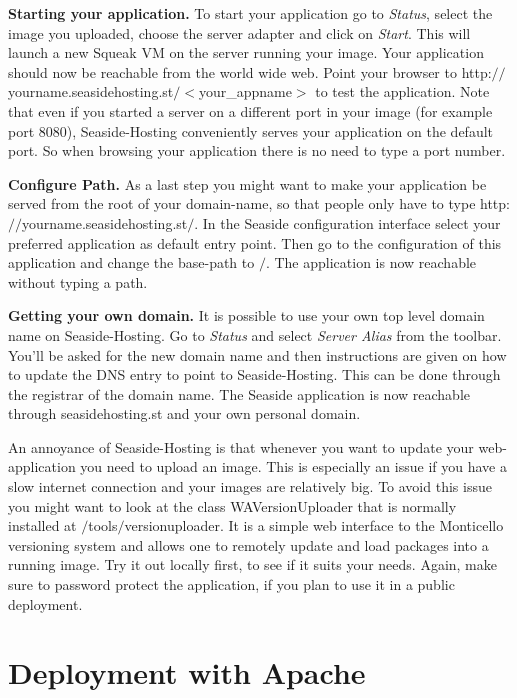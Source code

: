 \documentclass[a4paper,10pt,twoside]{book}
\newcommand{\ct}[1]{{\small\ttfamily\textup{#1}}}
\begin{document}
\textbf{Starting your application.} To start your application go to \textit{Status}, select the image you uploaded, choose the server adapter and click on \textit{Start}. This will launch a new Squeak VM on the server running your image. Your application should now be reachable from the world wide web. Point your browser to \ct{http:$/$$/$yourname.seasidehosting.st$/$$<$your\_appname$>$} to test the application. Note that even if you started a server on a different port in your image (for example port 8080), Seaside-Hosting conveniently serves your application on the default port. So when browsing your application there is no need to type a port number.

\textbf{Configure Path.} As a last step you might want to make your application be served from the root of your domain-name, so that people only have to type \ct{http:$/$$/$yourname.seasidehosting.st$/$}. In the Seaside configuration interface select your preferred application as default entry point. Then go to the configuration of this application and change the base-path to \ct{$/$}. The application is now reachable without typing a path.

\textbf{Getting your own domain.} It is possible to use your own top level domain name on Seaside-Hosting. Go to \textit{Status} and select \textit{Server Alias} from the toolbar. You'll be asked for the new domain name and then instructions are given on how to update the DNS entry to point to Seaside-Hosting. This can be done through the registrar of the domain name. The Seaside application is now reachable through \ct{seasidehosting.st} and your own personal domain.

An annoyance of Seaside-Hosting is that whenever you want to update your web-application you need to upload an image. This is especially an issue if you have a slow internet connection and your images are relatively big. To avoid this issue you might want to look at the class  \ct{WAVersionUploader} that is normally installed at \ct{$/$tools$/$versionuploader}. It is a simple web interface to the Monticello versioning system and allows one to remotely update and load packages into a running image. Try it out locally first, to see if it suits your needs. Again, make sure to password protect the application, if you plan to use it in a public deployment.

\section{Deployment with Apache}
\label{book:advanced:deployment:deploymentapache}
\end{document}
